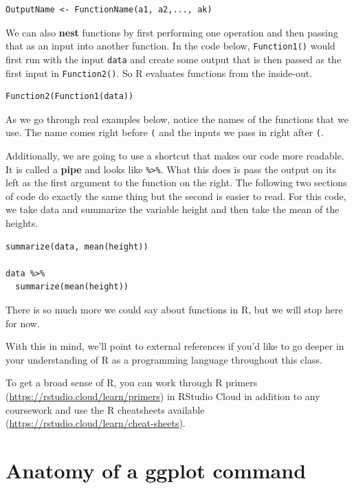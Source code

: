 \documentclass[]{book}
\begin{document}
\begin{verbatim}
OutputName <- FunctionName(a1, a2,..., ak)
\end{verbatim}

We can also \textbf{nest} functions by first performing one operation and then passing that as an input into another function. In the code below, \texttt{Function1()} would first run with the input \texttt{data} and create some output that is then passed as the first input in \texttt{Function2()}. So R evaluates functions from the inside-out.

\begin{verbatim}
Function2(Function1(data))
\end{verbatim}

As we go through real examples below, notice the names of the functions that we use. The name comes right before \texttt{(} and the inputs we pass in right after \texttt{(}.

Additionally, we are going to use a shortcut that makes our code more readable. It is called a \textbf{pipe} and looks like \texttt{\%\textgreater{}\%}. What this does is pass the output on its left as the first argument to the function on the right. The following two sections of code do exactly the same thing but the second is easier to read. For this code, we take data and summarize the variable height and then take the mean of the heights.

\begin{verbatim}
summarize(data, mean(height))

data %>%
  summarize(mean(height))
\end{verbatim}

There is so much more we could say about functions in R, but we will stop here for now.

With this in mind, we'll point to external references if you'd like to go deeper in your understanding of R as a programming language throughout this class.

To get a broad sense of R, you can work through R primers (\url{https://rstudio.cloud/learn/primers}) in RStudio Cloud in addition to any coursework and use the R cheatsheets available (\url{https://rstudio.cloud/learn/cheat-sheets}).

\hypertarget{anatomy-of-a-ggplot-command}{%
\section{Anatomy of a ggplot command}\label{anatomy-of-a-ggplot-command}}
\end{document}
